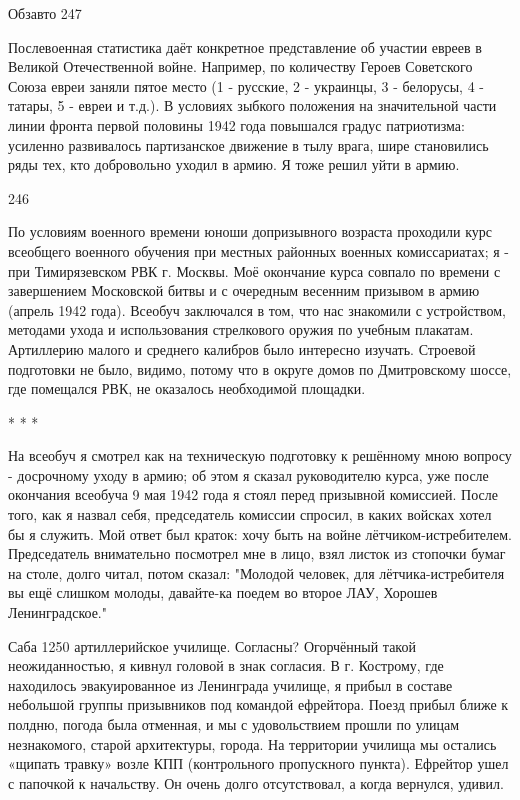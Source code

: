 Обзавто 247

Послевоенная статистика даёт конкретное представление об участии евреев в Великой Отечественной войне. Например, по количеству Героев Советского Союза евреи заняли пятое место (1 - русские, 2 - украинцы, 3 - белорусы, 4 - татары, 5 - евреи и т.д.). В условиях зыбкого положения на значительной части линии фронта первой половины 1942 года повышался градус патриотизма: усиленно развивалось партизанское движение в тылу врага, шире становились ряды тех, кто добровольно уходил в армию. Я тоже решил уйти в армию.

246

По условиям военного времени юноши допризывного возраста проходили курс всеобщего военного обучения при местных районных военных комиссариатах; я - при Тимирязевском РВК г. Москвы. Моё окончание курса совпало по времени с завершением Московской битвы и с очередным весенним призывом в армию (апрель 1942 года). Всеобуч заключался в том, что нас знакомили с устройством, методами ухода и использования стрелкового оружия по учебным плакатам. Артиллерию малого и среднего калибров было интересно изучать. Строевой подготовки не было, видимо, потому что в округе домов по Дмитровскому шоссе, где помещался РВК, не оказалось необходимой площадки.

* * *

На всеобуч я смотрел как на техническую подготовку к решённому мною вопросу - досрочному уходу в армию; об этом я сказал руководителю курса, уже после окончания всеобуча 9 мая 1942 года я стоял перед призывной комиссией. После того, как я назвал себя, председатель комиссии спросил, в каких войсках хотел бы я служить. Мой ответ был краток: хочу быть на войне лётчиком-истребителем. Председатель внимательно посмотрел мне в лицо, взял листок из стопочки бумаг на столе, долго читал, потом сказал: "Молодой человек, для лётчика-истребителя вы ещё слишком молоды, давайте-ка поедем во второе ЛАУ, Хорошев Ленинградское."

Саба 1250 артиллерийское училище. Согласны? Огорчённый такой неожиданностью, я кивнул головой в знак согласия. В г. Кострому, где находилось эвакуированное из Ленинграда училище, я прибыл в составе небольшой группы призывников под командой ефрейтора. Поезд прибыл ближе к полдню, погода была отменная, и мы с удовольствием прошли по улицам незнакомого, старой архитектуры, города. На территории училища мы остались «щипать травку» возле КПП (контрольного пропускного пункта). Ефрейтор ушел с папочкой к начальству. Он очень долго отсутствовал, а когда вернулся, удивил.

